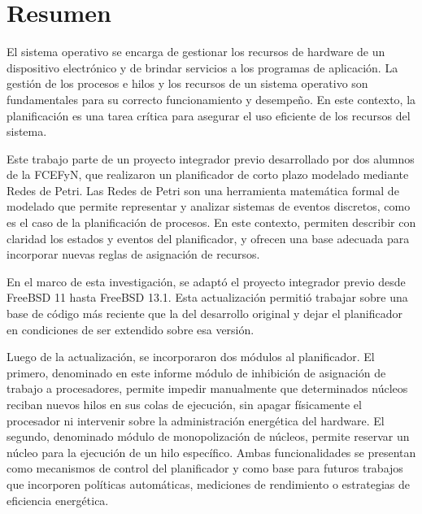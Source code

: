 \chapter*{Resumen}

El sistema operativo se encarga de gestionar los recursos de hardware de un dispositivo electrónico y de brindar servicios a los programas de aplicación. La gestión de los procesos e hilos y los recursos de un sistema operativo son fundamentales para su correcto funcionamiento y desempeño. En este contexto, la planificación es una tarea crítica para asegurar el uso eficiente de los recursos del sistema.

Este trabajo parte de un proyecto integrador previo desarrollado por dos alumnos de la FCEFyN, que realizaron un planificador de corto plazo modelado mediante Redes de Petri. Las Redes de Petri son una herramienta matemática formal de modelado que permite representar y analizar sistemas de eventos discretos, como es el caso de la planificación de procesos. En este contexto, permiten describir con claridad los estados y eventos del planificador, y ofrecen una base adecuada para incorporar nuevas reglas de asignación de recursos.

En el marco de esta investigación, se adaptó el proyecto integrador previo desde FreeBSD 11 hasta FreeBSD 13.1. Esta actualización permitió trabajar sobre una base de código más reciente que la del desarrollo original y dejar el planificador en condiciones de ser extendido sobre esa versión.

Luego de la actualización, se incorporaron dos módulos al planificador. El primero, denominado en este informe módulo de inhibición de asignación de trabajo a procesadores, permite impedir manualmente que determinados núcleos reciban nuevos hilos en sus colas de ejecución, sin apagar físicamente el procesador ni intervenir sobre la administración energética del hardware. El segundo, denominado módulo de monopolización de núcleos, permite reservar un núcleo para la ejecución de un hilo específico. Ambas funcionalidades se presentan como mecanismos de control del planificador y como base para futuros trabajos que incorporen políticas automáticas, mediciones de rendimiento o estrategias de eficiencia energética.
